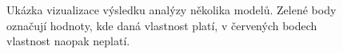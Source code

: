 \documentclass{parasim}
\begin{document}
\begin{figure}[h!]
	\centering
	\begin{subfigure}[b]{0.3\textwidth}
		\centering
	\end{subfigure}
	\begin{subfigure}[b]{0.3\textwidth}
		\centering
	\end{subfigure}
	\begin{subfigure}[b]{0.3\textwidth}
		\centering
	\end{subfigure}
	\caption{Ukázka vizualizace výsledku analýzy několika modelů. Zelené body označují hodnoty, kde daná vlastnost platí, v červených bodech vlastnost naopak neplatí.}
	\label{fig:vizualizace}
\end{figure}
\end{document}
